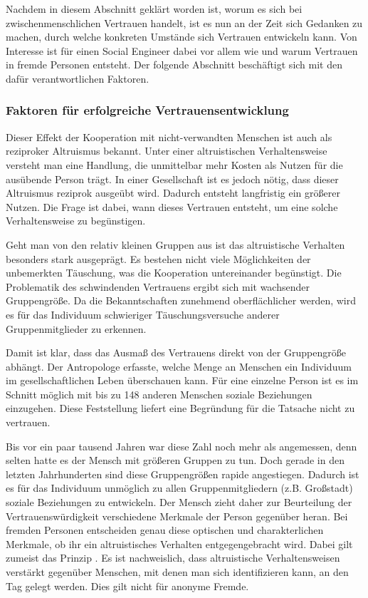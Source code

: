 Nachdem in diesem Abschnitt geklärt worden ist, worum es sich bei zwischenmenschlichen Vertrauen handelt, ist es nun an der Zeit sich Gedanken zu machen, durch welche konkreten Umstände sich Vertrauen entwickeln kann.
Von Interesse ist für einen Social Engineer dabei vor allem wie und warum Vertrauen in fremde Personen entsteht.
Der folgende Abschnitt beschäftigt sich mit den dafür verantwortlichen Faktoren.

\subsubsection{Faktoren für erfolgreiche Vertrauensentwicklung}
Dieser Effekt der Kooperation mit nicht-verwandten Menschen ist auch als reziproker Altruismus bekannt. Unter einer altruistischen Verhaltensweise versteht man eine Handlung, die unmittelbar mehr Kosten als Nutzen für die ausübende Person trägt.
In einer Gesellschaft ist es jedoch nötig, dass dieser Altruismus reziprok ausgeübt wird. Dadurch entsteht langfristig ein größerer Nutzen.
Die Frage ist dabei, wann dieses Vertrauen entsteht, um eine solche Verhaltensweise zu begünstigen.

Geht man von den relativ kleinen Gruppen aus ist das altruistische Verhalten besonders stark ausgeprägt. Es bestehen nicht viele Möglichkeiten der unbemerkten Täuschung, was die Kooperation untereinander begünstigt.
Die Problematik des schwindenden Vertrauens ergibt sich mit wachsender Gruppengröße.
Da die Bekanntschaften zunehmend oberflächlicher werden, wird es für das Individuum schwieriger Täuschungsversuche anderer Gruppenmitglieder zu erkennen.

Damit ist klar, dass das Ausmaß des Vertrauens direkt von der Gruppengröße abhängt. Der Antropologe  erfasste, welche Menge an Menschen ein Individuum im gesellschaftlichen Leben überschauen kann.
Für eine einzelne Person ist es im Schnitt möglich mit bis zu 148 anderen Menschen soziale Beziehungen einzugehen. Diese Feststellung liefert eine Begründung für die Tatsache  nicht zu vertrauen.
\cite{dunbar2010how}

Bis vor ein paar tausend Jahren war diese Zahl noch mehr als angemessen, denn selten hatte es der Mensch mit größeren Gruppen zu tun. Doch gerade in den letzten Jahrhunderten sind diese Gruppengrößen rapide angestiegen.
Dadurch ist es für das Individuum unmöglich zu allen Gruppenmitgliedern (z.B. Großstadt) soziale Beziehungen zu entwickeln.
Der Mensch zieht daher zur Beurteilung der Vertrauenswürdigkeit verschiedene Merkmale der Person gegenüber heran.
Bei fremden Personen entscheiden genau diese optischen und charakterlichen Merkmale, ob ihr ein altruistisches Verhalten entgegengebracht wird. Dabei gilt zumeist das Prinzip .
Es ist nachweislich, dass altruistische Verhaltensweisen verstärkt gegenüber Menschen, mit denen man sich identifizieren kann, an den Tag gelegt werden.
Dies gilt nicht für anonyme Fremde.

